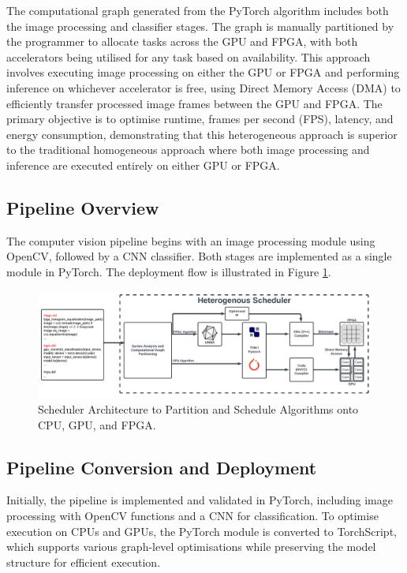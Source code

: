 \documentclass[]{spie}  %
\begin{document}
The computational graph generated from the PyTorch algorithm includes both the image processing and classifier stages. The graph is manually partitioned by the programmer to allocate tasks across the GPU and FPGA, with both accelerators being utilised for any task based on availability. This approach involves executing image processing on either the GPU or FPGA and performing inference on whichever accelerator is free, using Direct Memory Access (DMA) to efficiently transfer processed image frames between the GPU and FPGA. The primary objective is to optimise runtime, frames per second (FPS), latency, and energy consumption, demonstrating that this heterogeneous approach is superior to the traditional homogeneous approach where both image processing and inference are executed entirely on either GPU or FPGA.



\subsection{Pipeline Overview}

The computer vision pipeline begins with an image processing module using OpenCV, followed by a CNN classifier. Both stages are implemented as a single module in PyTorch. The deployment flow is illustrated in Figure \ref{fig:deployment_flow}.

\begin{figure}[ht]
\centering
\includegraphics[width=\textwidth]{images/SPIE_Deployment_Flow.png} 
\caption{Scheduler Architecture to Partition and Schedule Algorithms onto CPU, GPU, and FPGA.}
\label{fig:deployment_flow}
\end{figure}

\subsection{Pipeline Conversion and Deployment}

Initially, the pipeline is implemented and validated in PyTorch, including image processing with OpenCV functions and a CNN for classification. To optimise execution on CPUs and GPUs, the PyTorch module is converted to TorchScript, which supports various graph-level optimisations while preserving the model structure for efficient execution.
\end{document}
